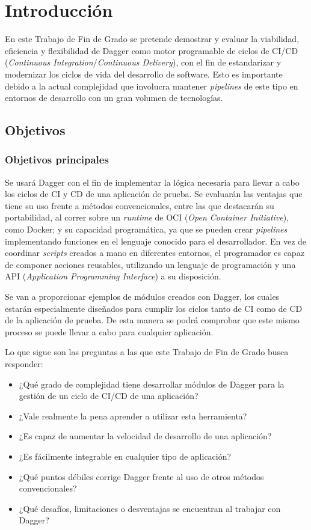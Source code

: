 \chapter{Introducción}

En este Trabajo de Fin de Grado se pretende demostrar y evaluar la viabilidad, eficiencia y flexibilidad de Dagger\cite{dagger} como motor programable de ciclos de CI/CD (\textit{Continuous Integration}/\textit{Continuous Delivery})\cite{ci,cd}, con el fin de estandarizar y modernizar los ciclos de vida del desarrollo de software. Esto es importante debido a la actual complejidad que involucra mantener \textit{pipelines} de este tipo en entornos de desarrollo con un gran volumen de tecnologías.

\section{Objetivos}

\subsection*{Objetivos principales}

Se usará Dagger con el fin de implementar la lógica necesaria para llevar a cabo los ciclos de CI y CD de una aplicación de prueba. Se evaluarán las ventajas que tiene su uso frente a métodos convencionales, entre las que destacarán su portabilidad, al correr sobre un \textit{runtime} de OCI (\textit{Open Container Initiative}\cite{oci}), como Docker\cite{docker}; y su capacidad programática, ya que se pueden crear \textit{pipelines} implementando funciones en el lenguaje conocido para el desarrollador. En vez de coordinar \textit{scripts} creados a mano en diferentes entornos, el programador es capaz de componer acciones reusables, utilizando un lenguaje de programación y una API (\textit{Application Programming Interface}) a su disposición.

Se van a proporcionar ejemplos de módulos creados con Dagger, los cuales estarán especialmente diseñados para cumplir los ciclos tanto de CI como de CD de la aplicación de prueba. De esta manera se podrá comprobar que este mismo proceso se puede llevar a cabo para cualquier aplicación.

Lo que sigue son las preguntas a las que este Trabajo de Fin de Grado busca responder:

\begin{itemize}
  \item ¿Qué grado de complejidad tiene desarrollar módulos de Dagger para la gestión de un ciclo de CI/CD de una aplicación?
  \item ¿Vale realmente la pena aprender a utilizar esta herramienta?
  \item ¿Es capaz de aumentar la velocidad de desarrollo de una aplicación?
  \item ¿Es fácilmente integrable en cualquier tipo de aplicación?
  \item ¿Qué puntos débiles corrige Dagger frente al uso de otros métodos convencionales?
  \item ¿Qué desafíos, limitaciones o desventajas se encuentran al trabajar con Dagger?
\end{itemize}

